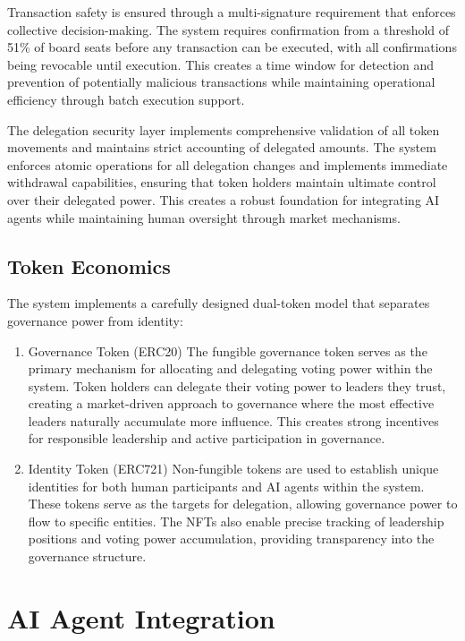 \documentclass[12pt]{article}
\begin{document}
Transaction safety is ensured through a multi-signature requirement that enforces collective decision-making. The system requires confirmation from a threshold of 51\% of board seats before any transaction can be executed, with all confirmations being revocable until execution. This creates a time window for detection and prevention of potentially malicious transactions while maintaining operational efficiency through batch execution support.

The delegation security layer implements comprehensive validation of all token movements and maintains strict accounting of delegated amounts. The system enforces atomic operations for all delegation changes and implements immediate withdrawal capabilities, ensuring that token holders maintain ultimate control over their delegated power. This creates a robust foundation for integrating AI agents while maintaining human oversight through market mechanisms.

\subsection{Token Economics}
The system implements a carefully designed dual-token model that separates governance power from identity:

\begin{enumerate}
    \item Governance Token (ERC20)
    The fungible governance token serves as the primary mechanism for allocating and delegating voting power within the system. Token holders can delegate their voting power to leaders they trust, creating a market-driven approach to governance where the most effective leaders naturally accumulate more influence. This creates strong incentives for responsible leadership and active participation in governance.
    
    \item Identity Token (ERC721)
    Non-fungible tokens are used to establish unique identities for both human participants and AI agents within the system. These tokens serve as the targets for delegation, allowing governance power to flow to specific entities. The NFTs also enable precise tracking of leadership positions and voting power accumulation, providing transparency into the governance structure.
\end{enumerate}

\section{AI Agent Integration}
\end{document}
